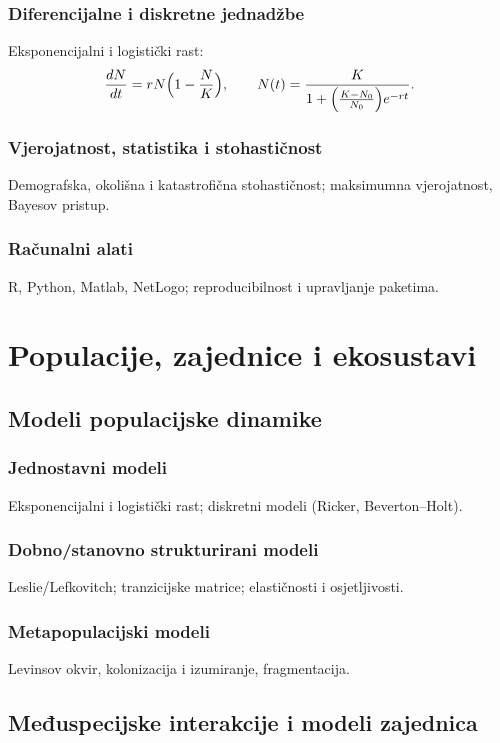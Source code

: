 \documentclass[12pt,oneside]{book}
\newcommand{\R}{\textsf{R}}
\newcommand{\Python}{\textsf{Python}}
\begin{document}
	\section{Diferencijalne i diskretne jednadžbe}
	Eksponencijalni i logistički rast:
	\begin{equation}
		\frac{dN}{dt} = rN\Bigl(1-\frac{N}{K}\Bigr), \qquad
		N(t)=\frac{K}{1+\Bigl(\frac{K-N_0}{N_0}\Bigr)e^{-rt}}.
	\end{equation}
	\section{Vjerojatnost, statistika i stohastičnost}
	Demografska, okolišna i katastrofična stohastičnost; maksimumna vjerojatnost, Bayesov pristup.
	\section{Računalni alati}
	\R, \Python, Matlab, NetLogo; reproducibilnost i upravljanje paketima.
	
	\part{Populacije, zajednice i ekosustavi}
	
	\chapter{Modeli populacijske dinamike}
	\section{Jednostavni modeli}
	Eksponencijalni i logistički rast; diskretni modeli (Ricker, Beverton--Holt).
	\section{Dobno/stanovno strukturirani modeli}
	Leslie/Lefkovitch; tranzicijske matrice; elastičnosti i osjetljivosti.
	\section{Metapopulacijski modeli}
	Levinsov okvir, kolonizacija i izumiranje, fragmentacija.
	
	\chapter{Međuspecijske interakcije i modeli zajednica}
\end{document}
